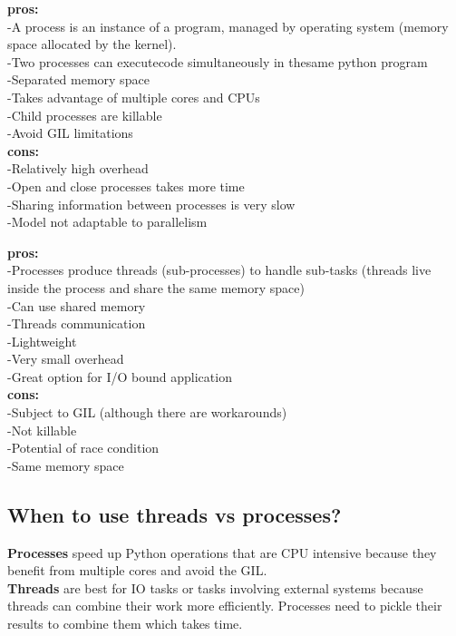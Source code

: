 \begin{tcolorbox}[width=\textwidth,colback={white},title={Process: pros and cons},colbacktitle=cyan,coltitle=black]
\textbf{pros:}\\
-A process is an instance of a program, managed by operating system (memory space allocated by the kernel).\\
-Two processes can executecode simultaneously in thesame python program\\
-Separated memory space\\
-Takes advantage of multiple cores and CPUs\\
-Child processes are killable\\
-Avoid GIL limitations\\
\textbf{cons:}\\
-Relatively high overhead\\
-Open and close processes takes more time\\
-Sharing information between processes is very slow\\
-Model not adaptable to parallelism
\end{tcolorbox}


\begin{tcolorbox}[width=\textwidth,colback={white},title={Threads: pros and cons},colbacktitle=green,coltitle=black]
\textbf{pros:}\\
-Processes produce threads (sub-processes) to handle sub-tasks (threads live inside the process and share the same memory space)\\

-Can use shared memory\\
-Threads communication\\
-Lightweight\\
-Very small overhead\\
-Great option for I/O bound application\\
\textbf{cons:}\\
-Subject to GIL (although there are workarounds)\\
-Not killable\\
-Potential of race condition \\
-Same memory space
\end{tcolorbox}

\subsection{When to use threads vs processes?}
\textbf{Processes} speed up Python operations that are CPU intensive because they benefit from multiple cores and avoid the GIL.\\
\textbf{Threads} are best for IO tasks or tasks involving external systems because threads can combine their work more efficiently. Processes need to pickle their results to combine them which takes time.\\

